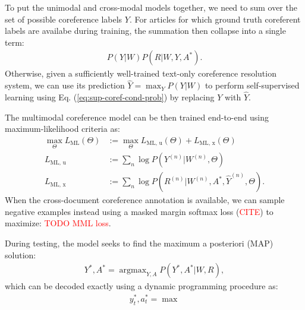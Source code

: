 \documentclass[11pt,a4paper]{article}
\newcommand{\bw}{\mathbf{w}}
\DeclareMathOperator{\argmax}{argmax}
\begin{document}
To put the unimodal and cross-modal models together, we need to sum over the set of possible coreference labels $Y$. For articles for which ground truth coreferent labels are availabe
during training, the summation then collapse into a single term:
\begin{align}\label{eq:sup-coref-cond-prob}
    P(Y|W) P(R|W, Y, A^*).
\end{align}
Otherwise, given a sufficiently well-trained text-only coreference resolution system, we can use its prediction $\hat{Y}=\max_{Y} P(Y|W)$ to perform self-supervised learning using Eq. (\ref{eq:sup-coref-cond-prob}) by replacing $Y$ with $\hat{Y}$.

The multimodal coreference model can be then trained end-to-end using maximum-likelihood criteria as:
\begin{align}\label{eq:ml-criterion}
     \max_{\Theta} L_{\text{ML}}(\Theta) &:= \max_{\Theta} L_{\text{ML, u}}(\Theta) + L_{\text{ML, x}}(\Theta)\\
     L_{\text{ML, u}} &:= \sum_{n}\log P(Y^{(n)}|W^{(n)}, \Theta)\\
     L_{\text{ML, x}} &:= \sum_{n}\log P(R^{(n)}|W^{(n)}, A^*, \hat{Y}^{(n)}, \Theta).
\end{align}
 When the cross-document coreference annotation is available, we can sample negative examples instead using a masked margin softmax loss (\textcolor{red}{CITE}) to maximize:
\textcolor{red}{TODO MML loss}.
 
 During testing, the model seeks to find the maximum a posteriori (MAP) solution:
 \begin{align}\label{eq:map-decode}
     Y^*, A^* = \argmax_{Y, A} P(Y^*, A^*|W, R),
 \end{align}
 which can be decoded exactly using a dynamic programming procedure as:
 \begin{align}\label{eq:map-decode-dp}
     y_t^*, a_t^* = \max
 \end{align}



%
\end{document}
